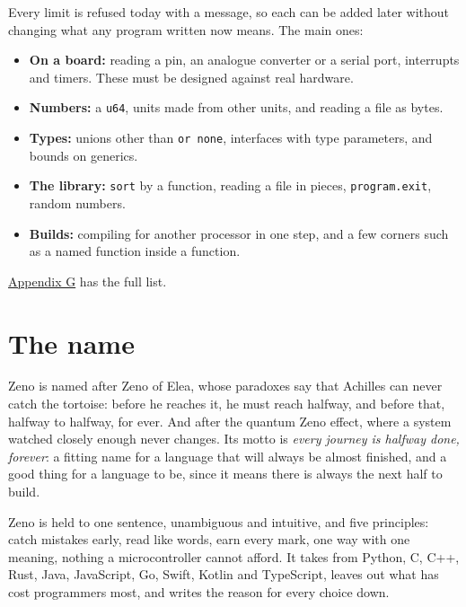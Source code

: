 Every limit is refused today with a message, so each can be added later
without changing what any program written now means. The main ones:

\begin{itemize}
\item \textbf{On a board:} reading a pin, an analogue converter or a
  serial port, interrupts and timers. These must be designed against
  real hardware.
\item \textbf{Numbers:} a \verb|u64|, units made from other units, and
  reading a file as bytes.
\item \textbf{Types:} unions other than \verb|or none|, interfaces with
  type parameters, and bounds on generics.
\item \textbf{The library:} \verb|sort| by a function, reading a file
  in pieces, \verb|program.exit|, random numbers.
\item \textbf{Builds:} compiling for another processor in one step,
  and a few corners such as a named function inside a function.
\end{itemize}

\hyperref[app-limits]{Appendix G} has the full list.

\section{The name}

Zeno is named after Zeno of Elea, whose paradoxes say that Achilles can
never catch the tortoise: before he reaches it, he must reach halfway,
and before that, halfway to halfway, for ever. And after the quantum
Zeno effect, where a system watched closely enough never changes. Its
motto is \emph{every journey is halfway done, forever}: a fitting name
for a language that will always be almost finished, and a good thing
for a language to be, since it means there is always the next half to
build.

\begin{summary}
Zeno is held to one sentence, unambiguous and intuitive, and five
principles: catch mistakes early, read like words, earn every mark, one
way with one meaning, nothing a microcontroller cannot afford. It takes
from Python, C, C++, Rust, Java, JavaScript, Go, Swift, Kotlin and
TypeScript, leaves out what has cost programmers most, and writes the
reason for every choice down.
\end{summary}
